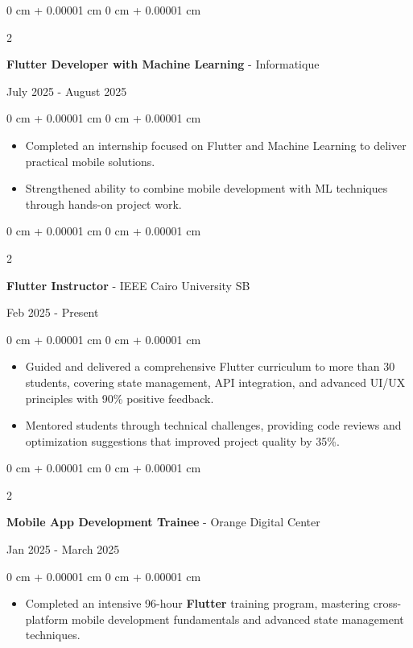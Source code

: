 \documentclass[10pt, letterpaper]{article}
\newenvironment{highlights}{
\begin{itemize}[
topsep=0.10 cm,
parsep=0.10 cm,
partopsep=0pt,
itemsep=0pt,
leftmargin=0 cm + 10pt
]
}{
\end{itemize}
} %
\newenvironment{onecolentry}{
\begin{adjustwidth}{
0 cm + 0.00001 cm
}{
0 cm + 0.00001 cm
}
}{
\end{adjustwidth}
} %
\newenvironment{twocolentry}[2][]{
\onecolentry
\def\secondColumn{#2}
\setcolumnwidth{\fill, 4.5 cm}
\begin{paracol}{2}
}{
\switchcolumn \raggedleft \secondColumn
\end{paracol}
\endonecolentry
} %
\begin{document}
\vspace{0.2 cm}
\begin{twocolentry}{
July 2025 - August 2025
}
\textbf{\large Flutter Developer with Machine Learning} - Informatique
\end{twocolentry}
\vspace{0.1 cm}
\begin{onecolentry}
\begin{highlights}

\item Completed an internship focused on Flutter and Machine Learning to deliver practical mobile solutions.

\item Strengthened ability to combine mobile development with ML techniques through hands-on project work.

\end{highlights}
\end{onecolentry}
\vspace{0.2 cm}
\begin{twocolentry}{
Feb 2025 - Present
}
\textbf{\large Flutter Instructor} - IEEE Cairo University SB
\end{twocolentry}
\vspace{0.1 cm}
\begin{onecolentry}
\begin{highlights}

\item Guided and delivered a comprehensive Flutter curriculum to more than 30 students, covering state management, API integration, and advanced UI/UX principles with 90\% positive feedback.
\item Mentored students through technical challenges, providing code reviews and optimization suggestions that improved project quality by 35\%.
\end{highlights}
\end{onecolentry}
\vspace{0.2 cm}


\begin{twocolentry}{
Jan 2025 - March 2025
}
\textbf{\large Mobile App Development Trainee} - Orange Digital Center
\end{twocolentry}
\vspace{0.1 cm}
\begin{onecolentry}
\begin{highlights}

\item Completed an intensive 96-hour \textbf{Flutter} training program, mastering cross-platform mobile development fundamentals and advanced state management techniques.


\end{highlights}
\end{onecolentry}
\end{document}
